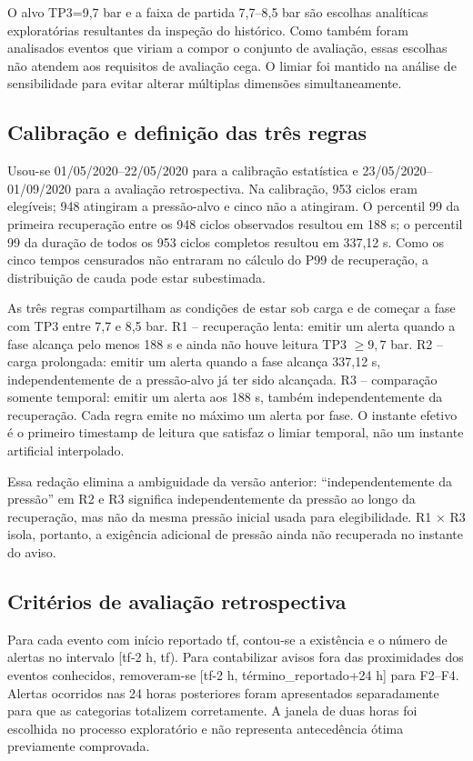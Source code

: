 \documentclass[conference]{IEEEtran}
\begin{document}
O alvo TP3=9,7 bar e a faixa de partida 7,7--8,5 bar são escolhas analíticas exploratórias resultantes da inspeção do histórico. Como também foram analisados eventos que viriam a compor o conjunto de avaliação, essas escolhas não atendem aos requisitos de avaliação cega. O limiar foi mantido na análise de sensibilidade para evitar alterar múltiplas dimensões simultaneamente.

\subsection{Calibração e definição das três regras}

Usou-se 01/05/2020--22/05/2020 para a calibração estatística e 23/05/2020--01/09/2020 para a avaliação retrospectiva. Na calibração, 953 ciclos eram elegíveis; 948 atingiram a pressão-alvo e cinco não a atingiram. O percentil 99 da primeira recuperação entre os 948 ciclos observados resultou em 188 s; o percentil 99 da duração de todos os 953 ciclos completos resultou em 337,12 s. Como os cinco tempos censurados não entraram no cálculo do P99 de recuperação, a distribuição de cauda pode estar subestimada.

As três regras compartilham as condições de estar sob carga e de começar a fase com TP3 entre 7,7 e 8,5 bar. R1 -- recuperação lenta: emitir um alerta quando a fase alcança pelo menos 188 s e ainda não houve leitura TP3 $\geq 9{,}7$ bar. R2 -- carga prolongada: emitir um alerta quando a fase alcança 337,12 s, independentemente de a pressão-alvo já ter sido alcançada. R3 -- comparação somente temporal: emitir um alerta aos 188 s, também independentemente da recuperação. Cada regra emite no máximo um alerta por fase. O instante efetivo é o primeiro timestamp de leitura que satisfaz o limiar temporal, não um instante artificial interpolado.

Essa redação elimina a ambiguidade da versão anterior: ``independentemente da pressão'' em R2 e R3 significa independentemente da pressão ao longo da recuperação, mas não da mesma pressão inicial usada para elegibilidade. R1 $\times$ R3 isola, portanto, a exigência adicional de pressão ainda não recuperada no instante do aviso.

\subsection{Critérios de avaliação retrospectiva}

Para cada evento com início reportado tf, contou-se a existência e o número de alertas no intervalo [tf-2 h, tf). Para contabilizar avisos fora das proximidades dos eventos conhecidos, removeram-se [tf-2 h, término\_reportado+24 h] para F2--F4. Alertas ocorridos nas 24 horas posteriores foram apresentados separadamente para que as categorias totalizem corretamente. A janela de duas horas foi escolhida no processo exploratório e não representa antecedência ótima previamente comprovada.
\end{document}
